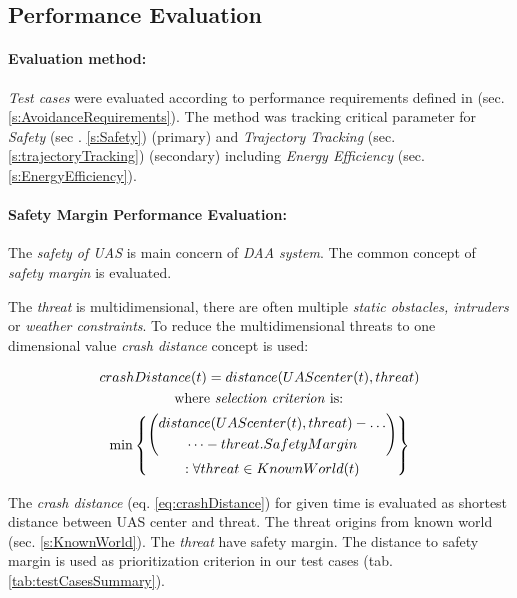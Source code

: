 \subsection{Performance Evaluation}\label{s:performanceEvaluation}
\paragraph{Evaluation method:} \emph{Test cases} were evaluated according to performance requirements defined in (sec. \ref{s:AvoidanceRequirements}). The method was tracking critical parameter for \emph{Safety} (sec . \ref{s:Safety}) (primary) and \emph{Trajectory Tracking} (sec. \ref{s:trajectoryTracking}) (secondary) including \emph{Energy Efficiency} (sec. \ref{s:EnergyEfficiency}).

\paragraph{Safety Margin Performance Evaluation:} The \emph{safety of UAS} is main concern of \emph{DAA system}. The common concept of \emph{safety margin} is evaluated. 

The \emph{threat} is multidimensional, there are often multiple \emph{static obstacles, intruders} or \emph{weather constraints}. To reduce the multidimensional threats to one dimensional value \emph{crash distance} concept is used:

\begin{multline}\label{eq:crashDistance}
    crashDistance(t) =  distance(UAScenter(t),threat) \\\text{  where \emph{selection criterion} is:  }\\ \min \left\{\begin{gathered}\left( \begin{gathered} distance(UAScenter(t),threat)-\dots\\\dots-threat.SafetyMargin\end{gathered}\right)\\:\forall threat \in KnownWorld (t)\end{gathered}\right\}
\end{multline}

The \emph{crash distance} (eq. \ref{eq:crashDistance}) for given time is evaluated as shortest distance between UAS center and threat. The threat origins from known world (sec. \ref{s:KnownWorld}). The \emph{threat} have safety margin. The distance to safety margin is used as prioritization criterion in our test cases (tab. \ref{tab:testCasesSummary}).



